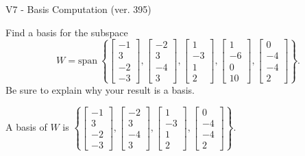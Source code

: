 \begin{exercise}
  \begin{exerciseTitle}V7 - Basis Computation (ver. 395)\end{exerciseTitle}
  \begin{exerciseStatement}
    Find a basis for the subspace 
\[W=\mathrm{span}\ \left\{\left[\begin{array}{r}
-1 \\
3 \\
-2 \\
-3
\end{array}\right] , \left[\begin{array}{r}
-2 \\
3 \\
-4 \\
3
\end{array}\right] , \left[\begin{array}{r}
1 \\
-3 \\
1 \\
2
\end{array}\right] , \left[\begin{array}{r}
1 \\
-6 \\
0 \\
10
\end{array}\right] , \left[\begin{array}{r}
0 \\
-4 \\
-4 \\
2
\end{array}\right]\right\}.\]
 Be sure to explain why your result is a basis.


  \end{exerciseStatement}
  \begin{exerciseAnswer}
   A basis of \(W\) is  \(\left\{\left[\begin{array}{r}
-1 \\
3 \\
-2 \\
-3
\end{array}\right] , \left[\begin{array}{r}
-2 \\
3 \\
-4 \\
3
\end{array}\right] , \left[\begin{array}{r}
1 \\
-3 \\
1 \\
2
\end{array}\right] , \left[\begin{array}{r}
0 \\
-4 \\
-4 \\
2
\end{array}\right]\right\}\).
  


  \end{exerciseAnswer}
\end{exercise}